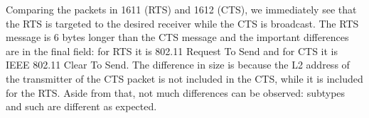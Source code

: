 Comparing the packets in 1611 (RTS) and 1612 (CTS), we immediately see that the RTS is targeted to the desired receiver while the CTS is broadcast. The RTS message is 6 bytes longer than the CTS message and the important differences are in the final field: for RTS it is 802.11 Request To Send and for CTS it is IEEE 802.11 Clear To Send.
The difference in size is because the L2 address of the transmitter of the CTS packet is not included in the CTS, while it is included for the RTS. Aside from that, not much differences can be observed: subtypes and such are different as expected.
